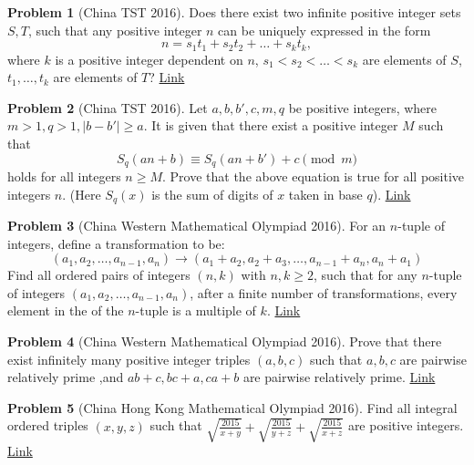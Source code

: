 \documentclass[]{article}
\theoremstyle{definition}
\newtheorem{problem}{Problem}
\begin{document}
\begin{problem}[China TST 2016]
	Does there exist two infinite positive integer sets $S,T$, such that any positive integer $n$ can be uniquely expressed in the form
	$$n=s_1t_1+s_2t_2+\dots+s_kt_k,$$where $k$ is a positive integer dependent on $n$, $s_1<s_2<\dots<s_k$ are elements of $S$, $t_1,\dots, t_k$ are elements of $T$? \hfill \href{http://artofproblemsolving.com/community/c6h1215112p6043327}{Link}
\end{problem}



\begin{problem}[China TST 2016]
	Let $a,b,b',c,m,q$ be positive integers, where $m>1,q>1,|b-b'|\ge a$. It is given that there exist a positive integer $M$ such that
	$$S_q(an+b)\equiv S_q(an+b')+c\pmod{m}$$
	holds for all integers $n\ge M$. Prove that the above equation is true for all positive integers $n$. (Here $S_q(x)$ is the sum of digits of $x$ taken in base $q$). \hfill \href{http://artofproblemsolving.com/community/c6h1217570p6069193}{Link}
\end{problem}



\begin{problem}[China Western Mathematical Olympiad 2016]
	For an $n$-tuple of integers, define a transformation to be:
	$$(a_1,a_2,\dots,a_{n-1},a_n)\rightarrow (a_1+a_2, a_2+a_3, \dots, a_{n-1}+a_n, a_n+a_1)$$
	Find all ordered pairs of integers $(n,k)$ with $n,k\geq 2$, such that for any $n$-tuple of integers $(a_1,a_2,\dots,a_{n-1},a_n)$, after a finite number of transformations, every element in the of the $n$-tuple is a multiple of $k$. \hfill \href{http://artofproblemsolving.com/community/c6h1292364p6843838}{Link}
\end{problem}



\begin{problem}[China Western Mathematical Olympiad 2016]
	Prove that there exist infinitely many positive integer triples $(a,b,c)$ such that $a ,b,c$ are pairwise relatively prime ,and $ab+c ,bc+a ,ca+b$ are pairwise relatively prime. \hfill \href{http://artofproblemsolving.com/community/c6h1290756p6827171}{Link}
\end{problem}



\begin{problem}[China Hong Kong Mathematical Olympiad 2016]
	Find all integral ordered triples $(x,y,z)$ such that $\displaystyle\sqrt{\frac{2015}{x+y}}+\sqrt{\frac{2015}{y+z}}+\sqrt{\frac{2015}{x+z}}$ are positive integers. \hfill \href{http://www.artofproblemsolving.com/community/c6h37234p233034}{Link}
\end{problem}
\end{document}
